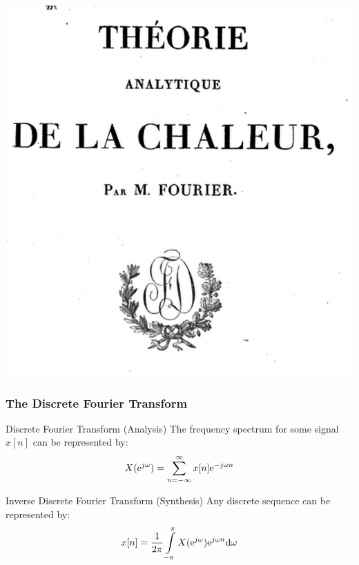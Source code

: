 \documentclass[mathserif,9pt,handout]{beamer}
\def\d{\mathrm{d}}
\begin{document}
\begin{frame}
\begin{center}
     \includegraphics[height=.4\textheight]{f4.png}\hspace{1em} 
  \end{center}
\end{frame}


\begin{frame}\frametitle{The Discrete Fourier Transform}
   
   \begin{block}{Discrete Fourier Transform (Analysis)}
   The frequency spectrum for some signal $x[n]$ can be represented by: 
   \begin{align}
     X({\textrm{e}}^{j\omega}) = \sum_{n=-\infty}^{\infty} x[n] {\textrm{e}}^{-j\omega n}
     \nonumber
   \end{align}
   \end{block}
   
   \begin{exampleblock}{Inverse Discrete Fourier Transform (Synthesis)}
   Any discrete sequence can be represented by: 
   \begin{align}
     x[n] = \frac{1}{2\pi} \int\limits_{-\pi}^{\pi} X(\e^{j\omega}) \e^{j\omega n} \d\omega
     \nonumber
   \end{align}
   \end{exampleblock}
\end{frame}
\end{document}
